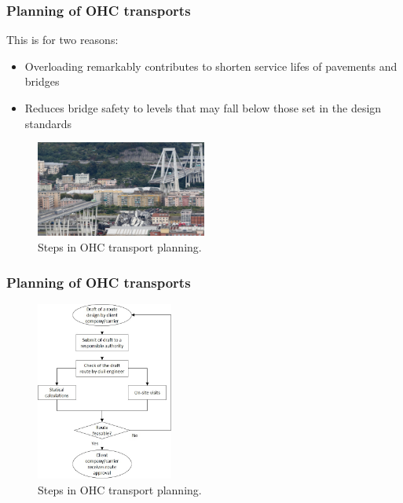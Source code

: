 \documentclass{beamer}   %
\newcommand{\RNum}[1]{\uppercase\expandafter{\romannumeral #1\relax}}
\theoremstyle{break}
\begin{document}
  \begin{frame}
    \frametitle{Planning of OHC transports  \RNum{2}}
    This is for two reasons:
    \begin{itemize}
      \item Overloading remarkably contributes to shorten service lifes of pavements and bridges
      \item Reduces bridge safety to levels that may fall below those set in the design standards \cite{fiorillo2018fragility}
    \end{itemize}
    \begin{figure}[!ht]
      \centering
      \includegraphics[width=0.5\textwidth]{../manuscript/figures/Collaps.jpg}
      \caption{Steps in OHC transport planning.}
      \label{fig:higher level}
    \end{figure}
  \end{frame}


  \begin{frame}
    \frametitle{Planning of OHC transports  \RNum{3}}
    \begin{figure}[!ht]
      \centering
      \includegraphics[width=0.4\textwidth]{../manuscript/figures/OHC Planning.jpg}
      \caption{Steps in OHC transport planning.}
      \label{fig:higher level}
    \end{figure}
  \end{frame}
\end{document}
